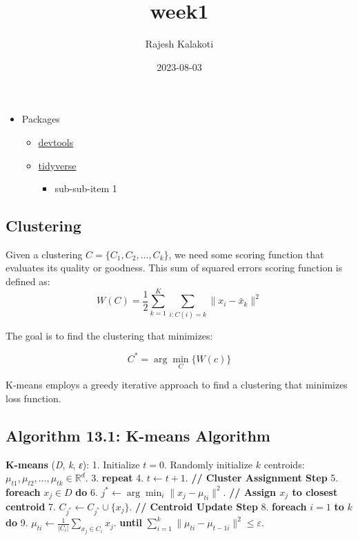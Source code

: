 \documentclass[
]{article}
\title{week1}
\author{Rajesh Kalakoti}
\date{2023-08-03}
\providecommand{\tightlist}{%
  \setlength{\itemsep}{0pt}\setlength{\parskip}{0pt}}
\begin{document}
\maketitle

\begin{itemize}
\tightlist
\item
  Packages

  \begin{itemize}
  \tightlist
  \item
    \href{https://www.r-project.org/nosvn/pandoc/devtools.html}{devtools}
  \item
    \href{https://www.tidyverse.org/packages/}{tidyverse}

    \begin{itemize}
    \tightlist
    \item
      sub-sub-item 1
    \end{itemize}
  \end{itemize}
\end{itemize}

\hypertarget{clustering}{%
\subsection{Clustering}\label{clustering}}

Given a clustering \(C = \{C_1, C_2, \ldots, C_k\}\), we need some
scoring function that evaluates its quality or goodness. This sum of
squared errors scoring function is defined as:
\[ W(C) = \frac{1}{2} \sum_{k=1}^{K} \sum_{i: C(i)=k} \|x_i - \bar{x}_k\|^2 \]

The goal is to find the clustering that minimizes:

\[ C^* = \arg \min_C \{ W(c) \} \]

K-means employs a greedy iterative approach to find a clustering that
minimizes loss function.

\hypertarget{algorithm-13.1-k-means-algorithm}{%
\subsection{Algorithm 13.1: K-means
Algorithm}\label{algorithm-13.1-k-means-algorithm}}

\textbf{K-means} (\emph{D}, \emph{k}, \emph{ε}): 1. Initialize
\(t = 0\). Randomly initialize \(k\) centroids:
\(\mu_{t1}, \mu_{t2}, \ldots, \mu_{tk} \in \mathbb{R}^d\). 3.
\textbf{repeat} 4. \(t \leftarrow t + 1\). \textbf{// Cluster Assignment
Step} 5. \textbf{foreach} \(x_j \in D\) \textbf{do} 6.
\(j^* \leftarrow \arg \min_i \|x_j - \mu_{ti}\|^2\). \textbf{// Assign
\(x_j\) to closest centroid} 7.
\(C_{j^*} \leftarrow C_{j^*} \cup \{x_j\}\). \textbf{// Centroid Update
Step} 8. \textbf{foreach} \(i = 1\) \textbf{to} \(k\) \textbf{do} 9.
\(\mu_{ti} \leftarrow \frac{1}{|C_i|} \sum_{x_j \in C_i} x_j\).
\textbf{until}
\(\sum_{i=1}^k \|\mu_{ti} - \mu_{t-1i}\|^2 \leq \varepsilon\).
\end{document}
